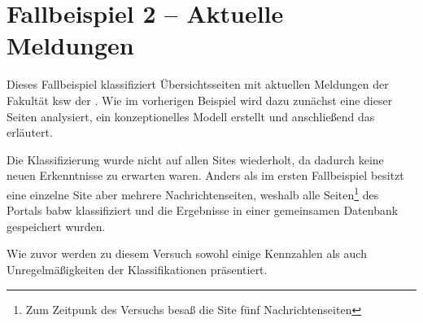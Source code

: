 \section{Fallbeispiel 2 -- Aktuelle Meldungen}
    Dieses Fallbeispiel klassifiziert Übersichtsseiten mit aktuellen
    Meldungen der Fakultät \gls{ksw} der {\fernUni}.
    Wie im vorherigen Beispiel wird dazu zunächst eine dieser Seiten analysiert,
    ein konzeptionelles Modell erstellt
    und anschließend das {\classificationModel} erläutert.

    Die Klassifizierung wurde nicht auf allen Sites wiederholt,
    da dadurch keine neuen Erkenntnisse zu erwarten waren.
    Anders als im ersten Fallbeispiel besitzt eine einzelne Site aber
    mehrere Nachrichtenseiten,
    weshalb alle Seiten\footnote{Zum Zeitpunk des Versuchs besaß die Site fünf Nachrichtenseiten}
    des Portals \gls{babw} klassifiziert und die Ergebnisse in einer gemeinsamen Datenbank gespeichert
    wurden.
    
    Wie zuvor werden zu diesem Versuch sowohl einige Kennzahlen
    als auch Unregelmäßigkeiten der Klassifikationen präsentiert.

    
    
    
    
